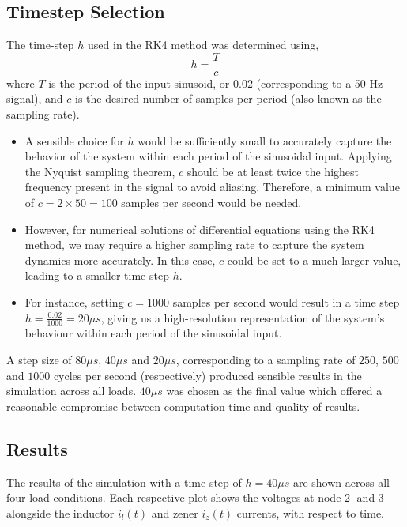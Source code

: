 \subsection{Timestep Selection}
The time-step $h$ used in the RK4 method was determined using,
\begin{equation}
	h = \frac{T}{c}
\end{equation}
where $T$ is the period of the input sinusoid, or $0.02$  (corresponding to a 50 Hz signal), and $c$ is the desired number of samples per period (also known as the sampling rate).
\begin{itemize}
	\item A sensible choice for \(h\) would be sufficiently small to accurately capture the behavior of the system within each period of the sinusoidal input. Applying the Nyquist sampling theorem, \(c\) should be at least twice the highest frequency present in the signal to avoid aliasing. Therefore, a minimum value of \(c = 2 \times 50 = 100\) samples per second would be needed.
	\item However, for numerical solutions of differential equations using the RK4 method, we may require a higher sampling rate to capture the system dynamics more accurately. In this case, \(c\) could be set to a much larger value, leading to a smaller time step \(h\).
	\item For instance, setting \(c = 1000\) samples per second would result in a time step $h = \frac{0.02}{1000} = 20\mu s$, giving us a high-resolution representation of the system's behaviour within each period of the sinusoidal input.
\end{itemize}

A step size of $80\mu s$, $40 \mu s$ and $20 \mu s$, corresponding to a sampling rate of $250$, $500$ and $1000$ cycles per second (respectively) produced sensible results in the simulation across all loads. $40 \mu s$ was chosen as the final value which offered a reasonable compromise between computation time and quality of results. 

\pagebreak
\subsection{Results}
The results of the simulation with a time step of $h = 40 \mu s$ are shown across all four load conditions. Each respective plot shows the voltages at node \textcircled{2} and \textcircled{3} alongside the inductor $i_l(t)$ and zener $i_z(t)$ currents, with respect to time.


